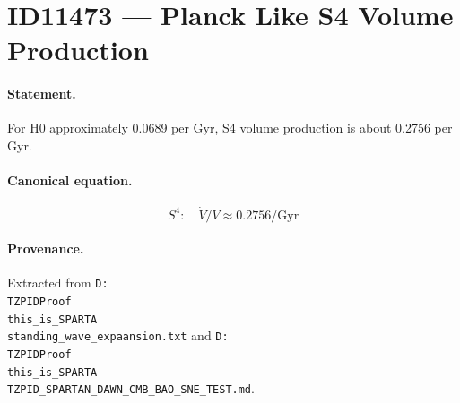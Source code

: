 \section*{ID11473 --- Planck Like S4 Volume Production}

\paragraph{Statement.}
For H0 approximately 0.0689 per Gyr, S4 volume production is about 0.2756 per Gyr.

\paragraph{Canonical equation.}
\[
S^4:\quad\dot V/V\approx0.2756/\mathrm{Gyr}
\]

\paragraph{Provenance.}
Extracted from \texttt{D:\\TZPIDProof\\this\_is\_SPARTA\\standing\_wave\_expaansion.txt} and \texttt{D:\\TZPIDProof\\this\_is\_SPARTA\\TZPID\_SPARTAN\_DAWN\_CMB\_BAO\_SNE\_TEST.md}.
